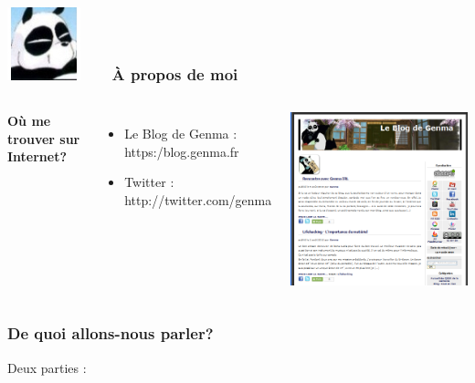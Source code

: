 \documentclass{beamer}
\begin{document}
\begin{frame}
\frametitle{\includegraphics[scale=0.4]{./images/Genma.jpg} \ \ \  À propos de moi  }
\begin{columns}[c] 
\textbf{Où me trouver sur Internet?}
\begin{itemize}
\item Le Blog de Genma : https:/blog.genma.fr
\item Twitter : http://twitter.com/genma
\end{itemize}
\includegraphics[scale=0.40] {./images/blog.png} 
\end{columns}
\end{frame}

\begin{frame}
\frametitle{De quoi allons-nous parler? }
Deux parties :
\begin{itemize}
\end{itemize}
\end{frame}
\end{document}
